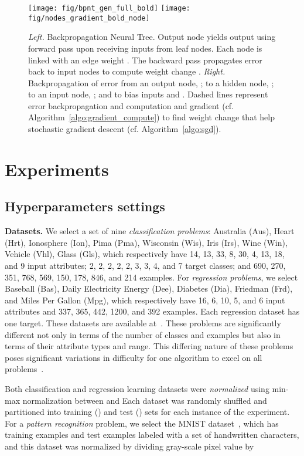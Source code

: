 \documentclass[11pt,a4paper]{article}
\begin{document}
    
    \begin{figure}
        \centering
        \texttt{[image: fig/bpnt\_gen\_full\_bold]}	\texttt{[image: fig/nodes\_gradient\_bold\_node]}
\caption{\textit{Left.} Backpropagation Neural Tree.  Output node  yields output  using forward pass upon receiving inputs  from leaf nodes. Each node is linked with an edge weight . The backward pass propagates error  back to input nodes to compute weight change . \textit{Right.} Backpropagation of error from an output node, ; to a hidden node, ; to an input node, ; and to bias inputs  and . Dashed lines represent error backpropagation  and computation  and gradient  (cf. Algorithm~\ref{algo:gradient_compute}) to find weight change  that help stochastic gradient descent (cf. Algorithm~\ref{algo:sgd}).
        \label{fig:BNeuralT}}
\end{figure}
    

    \section{Experiments}
    \label{sec:exp_setup}
\subsection{Hyperparameters settings}
    \label{sec:hyperparamter}
    \textbf{Datasets.} We select a set of nine \textit{classification problems}: Australia (Aus), Heart (Hrt), Ionosphere (Ion), Pima (Pma), Wisconsin (Wis), Iris (Irs), Wine (Win), Vehicle (Vhl), Glass (Gls), which respectively have 14, 13, 33, 8, 30, 4, 13, 18, and 9 input attributes; 2, 2, 2, 2, 2, 3, 3, 4, and 7 target classes; and 690, 270, 351, 768, 569, 150, 178, 846, and 214 examples. For \textit{regression problems}, we select Baseball (Bas), Daily Electricity Energy (Dee), Diabetes (Dia), Friedman (Frd), and Miles Per Gallon (Mpg), which respectively have 16, 6, 10, 5, and 6 input attributes and 337, 365, 442, 1200, and 392 examples. Each regression dataset has one target. These datasets are available at~\citep{lichman2013uci,keelDataSet}. These problems are significantly different not only in terms of the number of classes and examples but also in terms of their attribute types and range. This differing nature of these problems poses significant variations in difficulty for one algorithm to excel on all problems~\citep{wolpert1996lack}. 
    
    Both classification and regression learning datasets were \textit{normalized} using min-max normalization between  and  Each dataset was randomly shuffled and partitioned into training () and test () sets for each instance of the experiment. 
For a \textit{pattern recognition} problem, we select the MNIST dataset~\citep{mnistDataSet}, which has  training examples and  test examples labeled with a set of  handwritten characters, and this dataset was normalized by dividing gray-scale pixel value by 
    
\end{document}
